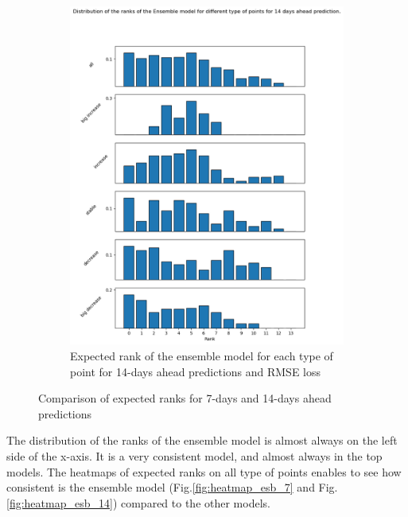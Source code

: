 \begin{figure}[htbp]
\begin{subfigure}[b]{0.45\textwidth}
        \label{fig:esb_rank_7}
    \end{subfigure}
    \hfill
    \begin{subfigure}[b]{0.45\textwidth}
        \centering
        \includegraphics[width=\textwidth]{figures/esb_rank_14.png}
        \caption{Expected rank of the ensemble model for each type of point for 14-days ahead predictions and RMSE loss}
        \label{fig:esb_rank_14}
    \end{subfigure}
    \caption{Comparison of expected ranks for 7-days and 14-days ahead predictions}
    \label{fig:esb_rank_comparison}
\end{figure}

The distribution of the ranks of the ensemble model is almost always on the left side of the x-axis.
It is a very consistent model, and almost always in the top models. 
The heatmaps of expected ranks on all type of points enables to see how consistent is the ensemble model (Fig.\ref{fig:heatmap_esb_7} and Fig.\ref{fig:heatmap_esb_14}) compared to the other models. 


